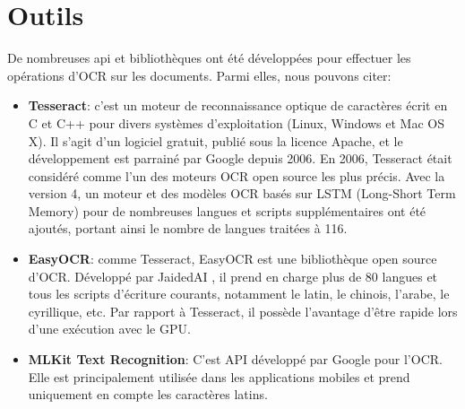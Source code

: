 \section{Outils}
De nombreuses \acrshort{api} et bibliothèques ont été développées pour effectuer les opérations d’OCR sur les documents. Parmi elles, nous pouvons citer:

\begin{itemize}
    \item \textbf{Tesseract}: c’est un moteur de reconnaissance optique de caractères écrit en C et C++ pour divers systèmes d'exploitation (Linux, Windows et Mac OS X). Il s'agit d'un logiciel gratuit, publié sous la licence Apache, et le développement est parrainé par Google depuis 2006. En 2006, Tesseract était considéré comme l'un des moteurs OCR open source les plus précis. Avec la version 4, un moteur et des modèles OCR basés sur LSTM (Long-Short Term Memory) pour de nombreuses langues et scripts supplémentaires ont été ajoutés, portant ainsi le nombre de langues traitées à 116.
    \item \textbf{EasyOCR}: comme Tesseract, EasyOCR est une bibliothèque  open source d’OCR. Développé par JaidedAI , il prend en charge plus de 80 langues et tous les scripts d'écriture courants, notamment le latin, le chinois, l'arabe, le cyrillique, etc. Par rapport à Tesseract, il possède l’avantage d’être rapide lors d’une exécution avec le GPU.
    \item \textbf{MLKit Text Recognition}: 
    C’est API développé par Google pour l’OCR. Elle est principalement utilisée dans les applications mobiles et prend uniquement en compte les caractères latins.
    
\end{itemize}
